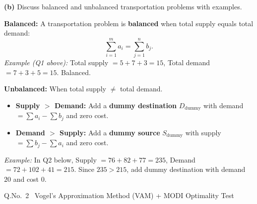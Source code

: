 \documentclass[12pt]{article}
\begin{document}
\medskip
\textbf{(b)} Discuss balanced and unbalanced transportation problems with examples.

\begin{ansbox}
\textbf{Balanced:} A transportation problem is \textbf{balanced} when total supply equals total demand:
\[
  \sum_{i=1}^{m} a_i = \sum_{j=1}^{n} b_j.
\]
\textit{Example (Q1 above):} Total supply $= 5+7+3=15$, Total demand $= 7+3+5=15$. Balanced. \checkmark

\medskip
\textbf{Unbalanced:} When total supply $\neq$ total demand.

\begin{itemize}[nosep]
  \item \textbf{Supply $>$ Demand:} Add a \textbf{dummy destination} $D_{\text{dummy}}$ with demand $= \sum a_i - \sum b_j$ and zero cost.
  \item \textbf{Demand $>$ Supply:} Add a \textbf{dummy source} $S_{\text{dummy}}$ with supply $= \sum b_j - \sum a_i$ and zero cost.
\end{itemize}

\textit{Example:} In Q2 below, Supply $= 76+82+77=235$, Demand $= 72+102+41=215$. Since $235>215$, add dummy destination with demand $20$ and cost $0$.
\end{ansbox}

\newpage

\begin{qbox}{Q.No.\ 2 \textemdash\ Vogel's Approximation Method (VAM) + MODI Optimality Test}
\end{qbox}
\end{document}
